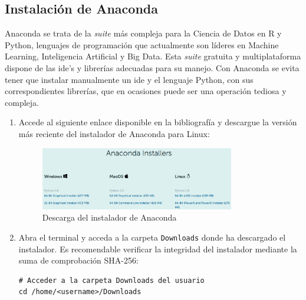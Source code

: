 \subsection{Instalación de Anaconda}
\label{subsec:instalacion-anaconda}

Anaconda se trata de la \textit{suite} más compleja para la Ciencia de Datos en R y Python, lenguajes de programación que actualmente son líderes en Machine Learning, Inteligencia Artificial y Big Data. Esta \textit{suite} gratuita y multiplataforma dispone de las \gls{ide}'s y librerías adecuadas para su manejo. Con Anaconda se evita tener que instalar manualmente un \gls{ide} y el lenguaje Python, con sus correspondientes librerías, que en ocasiones puede ser una operación tediosa y compleja.

\begin{enumerate}
    \item Accede al siguiente enlace \cite{inst-conda} disponible en la bibliografía y descargue la versión más reciente del instalador de Anaconda para Linux:
    
    \begin{figure}[ht]
    \centering
    \includegraphics[width=0.8\textwidth]{img/appendix/C/anaconda-installer.png}
    \caption{\label{fig:anaconda-download}Descarga del instalador de Anaconda}
    \end{figure}

    \item Abra el terminal y acceda a la carpeta \texttt{Downloads} donde ha descargado el instalador. Es recomendable verificar la integridad del instalador mediante la suma de comprobación SHA-256:
    
    \vspace{0.5cm}
    
    
\begin{lstlisting}[language=iPython,caption=Verificación de la integridad de la instalación de Anaconda,captionpos=b,label={lst:verificar-sha256}]
# Acceder a la carpeta Downloads del usuario
cd /home/<username>/Downloads


\end{lstlisting}
\end{enumerate}
